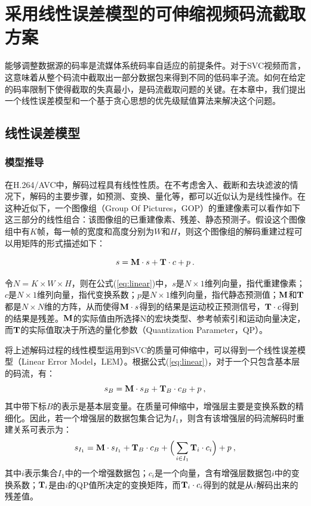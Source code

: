 \chapter{采用线性误差模型的可伸缩视频码流截取方案}

能够调整数据源的码率是流媒体系统码率自适应的前提条件。对于SVC视频而言，这意味着从整个码流中截取出一部分数据包来得到不同的低码率子流。如何在给定的码率限制下使得截取的失真最小，是码流截取问题的关键。在本章中，我们提出一个线性误差模型和一个基于贪心思想的优先级赋值算法来解决这个问题。

\section{线性误差模型}

\subsection{模型推导}

在H.264/AVC中，解码过程具有线性性质\supercite{Winken2008}。在不考虑舍入、截断和去块滤波的情况下，解码的主要步骤，如预测、变换、量化等，都可以近似认为是线性操作。在这种近似下，一个图像组（Group Of Pictures，GOP）的重建像素可以看作如下这三部分的线性组合：该图像组的已重建像素、残差、静态预测子。假设这个图像组中有$K$帧，每一帧的宽度和高度分别为$W$和$H$，则这个图像组的解码重建过程可以用矩阵的形式描述如下：

\begin{equation}
\label{eq:linear}
s = {\rm\bf M} \cdot s + {\rm\bf T} \cdot c + p \: .
\end{equation}

令$N = K \times W \times H$，则在公式(\ref{eq:linear})中，$s$是$N \times 1$维列向量，指代重建像素；$c$是$N \times 1$维列向量，指代变换系数；$p$是$N \times 1$维列向量，指代静态预测值；$\rm\bf M$和$\rm\bf T$都是$N \times N$维的方阵，从而使得${\rm\bf M} \cdot s$得到的结果是运动校正预测信号，${\rm\bf T} \cdot c$得到的结果是残差。$\rm\bf M$的实际值由所选择N的宏块类型、参考帧索引和运动向量决定，而$\rm\bf T$的实际值取决于所选的量化参数（Quantization Parameter，QP）。

将上述解码过程的线性模型运用到SVC的质量可伸缩中，可以得到一个线性误差模型（Linear Error Model，LEM）。根据公式(\ref{eq:linear})，对于一个只包含基本层的码流，有：
\begin{equation}
\vspace{10pt}
\label{eq:base0}
s_{B} = {\rm\bf M} \cdot s_{B} + {\rm\bf T}_{B} \cdot c_{B} + p \: ,
\end{equation}
其中带下标$B$的表示是基本层变量。在质量可伸缩中，增强层主要是变换系数的精细化。因此，若一个增强层的数据包集合记为$I_1$，则含有该增强层的码流解码时重建关系可表示为：
\begin{equation}
\vspace{10pt}
\label{eq:subset1}
s_{I_1} = {\rm\bf M} \cdot s_{I_1} + {\rm\bf T}_{B} \cdot c_{B} + \Big( \sum_{i \in I_1}{\rm\bf T}_i \cdot c_i \Big) + p \: ,
\end{equation}
其中$i$表示集合$I_1$中的一个增强数据包；$c_i$是一个向量，含有增强层数据包$i$中的变换系数；${\rm\bf T}_i$是由$i$的QP值所决定的变换矩阵，而${\rm\bf T}_i \cdot c_i$得到的就是从$i$解码出来的残差值。

